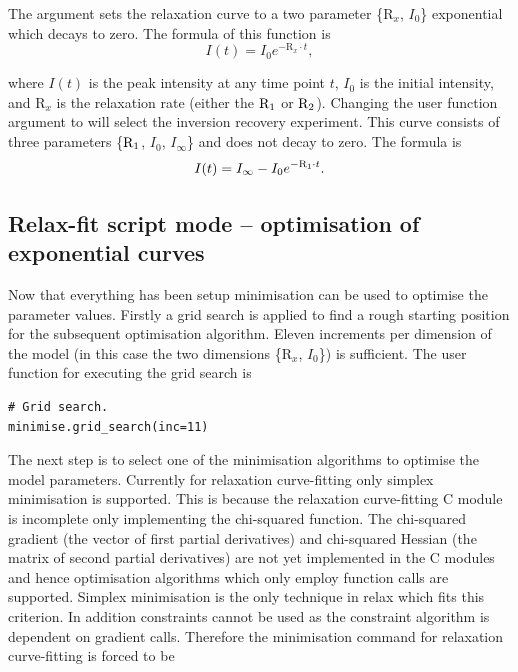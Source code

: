 The argument  sets the relaxation curve to a two parameter \{$\mathrm{R}_x$, $I_0$\} exponential which decays to zero.
The formula of this function is
\begin{equation}
 I(t) = I_0 e^{-\mathrm{R}_x \cdot t},
\end{equation}

\noindent where $I(t)$ is the peak intensity at any time point $t$, $I_0$ is the initial intensity, and $\mathrm{R}_x$ is the relaxation rate (either the $\mathrm{R}_1$ or $\mathrm{R}_2$).
Changing the user function argument to  will select the inversion recovery experiment.
This curve consists of three parameters \{$\mathrm{R}_1$, $I_0$, $I_{\infty}$\} and does not decay to zero.
The formula is
\begin{equation}
 I(t) = I_{\infty} - I_0 e^{-\mathrm{R}_1 \cdot t}.
\end{equation}




\subsection{Relax-fit script mode -- optimisation of exponential curves}

Now that everything has been setup minimisation can be used to optimise the parameter values.
Firstly a grid search is applied to find a rough starting position for the subsequent optimisation algorithm.
Eleven increments per dimension of the model (in this case the two dimensions \{$\mathrm{R}_x$, $I_0$\}) is sufficient.
The user function for executing the grid search is

\begin{lstlisting}[firstnumber=62]
# Grid search.
minimise.grid_search(inc=11)
\end{lstlisting}

The next step is to select one of the minimisation algorithms to optimise the model parameters.
Currently for relaxation curve-fitting only simplex minimisation is supported.
This is because the relaxation curve-fitting C module is incomplete only implementing the chi-squared function.
The chi-squared gradient (the vector of first partial derivatives) and chi-squared Hessian (the matrix of second partial derivatives) are not yet implemented in the C modules and hence optimisation algorithms which only employ function calls are supported.
Simplex minimisation is the only technique in relax which fits this criterion.
In addition constraints cannot be used as the constraint algorithm is dependent on gradient calls.
Therefore the minimisation command for relaxation curve-fitting is forced to be

